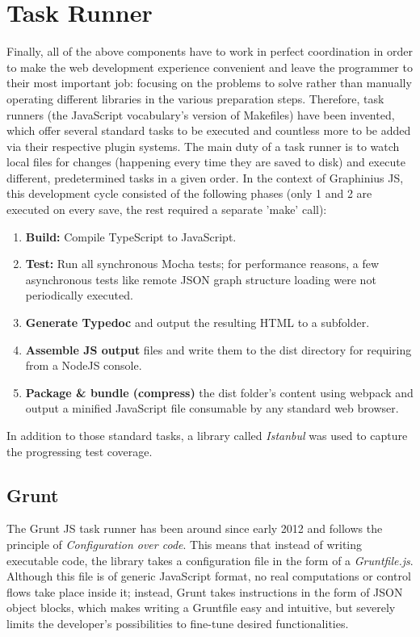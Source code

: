 \section{Task Runner}
\label{sect:build_system}

	Finally, all of the above components have to work in perfect coordination in order to make the web development experience convenient and leave the programmer to their most important job: focusing on the problems to solve rather than manually operating different libraries in the various preparation steps. Therefore, task runners (the JavaScript vocabulary's version of Makefiles) have been invented, which offer several standard tasks to be executed and countless more to be added via their respective plugin systems. The main duty of a task runner is to watch local files for changes (happening every time they are saved to disk) and execute different, predetermined tasks in a given order. In the context of Graphinius JS, this development cycle consisted of the following phases (only 1 and 2 are executed on every save, the rest required a separate 'make' call):
	
	\begin{enumerate}
		\item \textbf{Build:} Compile TypeScript to JavaScript.
		\item \textbf{Test:} Run all synchronous Mocha tests; for performance reasons, a few asynchronous tests like remote JSON graph structure loading were not periodically executed.
		\item \textbf{Generate Typedoc} and output the resulting HTML to a subfolder.
		\item \textbf{Assemble JS output} files and write them to the dist directory for requiring from a NodeJS console.
		\item \textbf{Package \& bundle (compress)} the dist folder's content using webpack and output a minified JavaScript file consumable by any standard web browser.
	\end{enumerate}
	
	In addition to those standard tasks, a library called \textit{Istanbul} was used to capture the progressing test coverage.


	\subsection{Grunt}
	\label{ssect:grunt}
	
	The	Grunt JS task runner has been around since early 2012 and follows the principle of \textit{Configuration over code}. This means that instead of writing executable code, the library takes a configuration file in the form of a \textit{Gruntfile.js}. Although this file is of generic JavaScript format, no real computations or control flows take place inside it; instead, Grunt takes instructions in the form of JSON object blocks, which makes writing a Gruntfile easy and intuitive, but severely limits the developer's possibilities to fine-tune desired functionalities.
	
